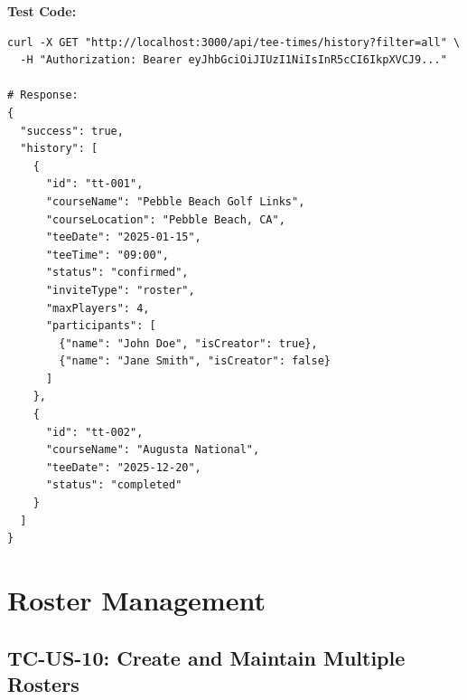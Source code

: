 \documentclass[11pt,a4paper]{article}
\begin{document}
\vspace{0.3cm}
\textbf{Test Code:}
\begin{lstlisting}
curl -X GET "http://localhost:3000/api/tee-times/history?filter=all" \
  -H "Authorization: Bearer eyJhbGciOiJIUzI1NiIsInR5cCI6IkpXVCJ9..."

# Response:
{
  "success": true,
  "history": [
    {
      "id": "tt-001",
      "courseName": "Pebble Beach Golf Links",
      "courseLocation": "Pebble Beach, CA",
      "teeDate": "2025-01-15",
      "teeTime": "09:00",
      "status": "confirmed",
      "inviteType": "roster",
      "maxPlayers": 4,
      "participants": [
        {"name": "John Doe", "isCreator": true},
        {"name": "Jane Smith", "isCreator": false}
      ]
    },
    {
      "id": "tt-002",
      "courseName": "Augusta National",
      "teeDate": "2025-12-20",
      "status": "completed"
    }
  ]
}
\end{lstlisting}

\newpage


\section{Roster Management}

\subsection{TC-US-10: Create and Maintain Multiple Rosters}
\end{document}
